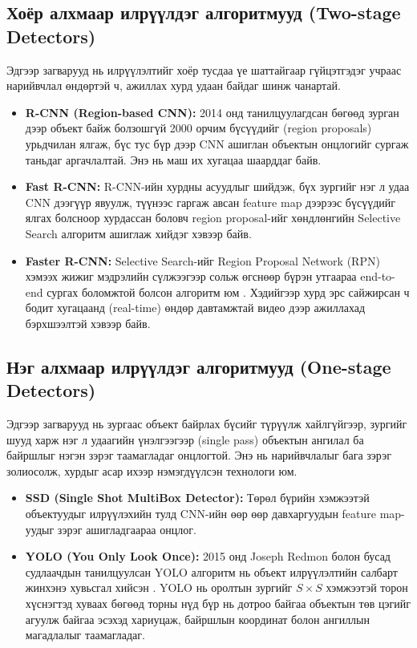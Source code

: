 \subsection{Хоёр алхмаар илрүүлдэг алгоритмууд (Two-stage Detectors)}
Эдгээр загварууд нь илрүүлэлтийг хоёр тусдаа үе шаттайгаар гүйцэтгэдэг учраас нарийвчлал өндөртэй ч, ажиллах хурд удаан байдаг шинж чанартай.
\begin{itemize}
    \item \textbf{R-CNN (Region-based CNN):} 2014 онд танилцуулагдсан бөгөөд зурган дээр объект байж болзошгүй 2000 орчим бүсүүдийг (region proposals) урьдчилан ялгаж, бүс тус бүр дээр CNN ашиглан объектын онцлогийг сургаж таньдаг аргачлалтай. Энэ нь маш их хугацаа шаарддаг байв.
    \item \textbf{Fast R-CNN:} R-CNN-ийн хурдны асуудлыг шийдэж, бүх зургийг нэг л удаа CNN дээгүүр явуулж, түүнээс гаргаж авсан feature map дээрээс бүсүүдийг ялгах болсноор хурдассан боловч region proposal-ийг хөндлөнгийн Selective Search алгоритм ашиглаж хийдэг хэвээр байв.
    \item \textbf{Faster R-CNN:} Selective Search-ийг Region Proposal Network (RPN) хэмээх жижиг мэдрэлийн сүлжээгээр сольж өгснөөр бүрэн утгаараа end-to-end сургах боломжтой болсон алгоритм юм \cite{faster_rcnn}. Хэдийгээр хурд эрс сайжирсан ч бодит хугацаанд (real-time) өндөр давтамжтай видео дээр ажиллахад бэрхшээлтэй хэвээр байв.
\end{itemize}

\subsection{Нэг алхмаар илрүүлдэг алгоритмууд (One-stage Detectors)}
Эдгээр загварууд нь зургаас объект байрлах бүсийг түрүүлж хайлгүйгээр, зургийг шууд харж нэг л удаагийн үнэлгээгээр (single pass) объектын ангилал ба байршлыг нэгэн зэрэг таамагладаг онцлогтой. Энэ нь нарийвчлалыг бага зэрэг золиосолж, хурдыг асар ихээр нэмэгдүүлсэн технологи юм.
\begin{itemize}
    \item \textbf{SSD (Single Shot MultiBox Detector):} Төрөл бүрийн хэмжээтэй объектуудыг илрүүлэхийн тулд CNN-ийн өөр өөр давхаргуудын feature map-уудыг зэрэг ашигладгаараа онцлог.
    \item \textbf{YOLO (You Only Look Once):} 2015 онд Joseph Redmon болон бусад судлаачдын танилцуулсан YOLO алгоритм нь объект илрүүлэлтийн салбарт жинхэнэ хувьсгал хийсэн \cite{yolo_original}. YOLO нь оролтын зургийг $S \times S$ хэмжээтэй торон хүснэгтэд хуваах бөгөөд торны нүд бүр нь дотроо байгаа объектын төв цэгийг агуулж байгаа эсэхэд хариуцаж, байршлын координат болон ангиллын магадлалыг таамагладаг. 
\end{itemize}

